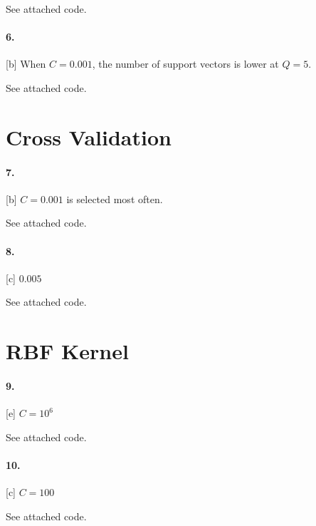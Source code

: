 \documentclass[10pt,letter]{article}
\begin{document}
	See attached code. 

\paragraph{6.} [b] When $C = 0.001$, the number of support vectors is lower at $Q = 5$.

	See attached code. 

\section*{Cross Validation}

\paragraph{7.} [b] $C = 0.001$ is selected most often.

	See attached code. 

\paragraph{8.} [c] $0.005$

	See attached code. 

\section*{RBF Kernel}

\paragraph{9.} [e] $C = 10^6$

	See attached code. 

\paragraph{10.} [c] $C = 100$

	See attached code. 
\end{document}
